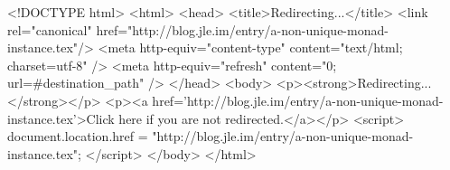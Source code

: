 <!DOCTYPE html>
<html>
<head>
<title>Redirecting...</title>
<link rel="canonical" href="http://blog.jle.im/entry/a-non-unique-monad-instance.tex"/>
<meta http-equiv="content-type" content="text/html; charset=utf-8" />
<meta http-equiv="refresh" content="0; url=#{destination_path}" />
</head>
<body>
  <p><strong>Redirecting...</strong></p>
  <p><a href='http://blog.jle.im/entry/a-non-unique-monad-instance.tex'>Click here if you are not redirected.</a></p>
  <script>
    document.location.href = "http://blog.jle.im/entry/a-non-unique-monad-instance.tex";
  </script>
</body>
</html>
